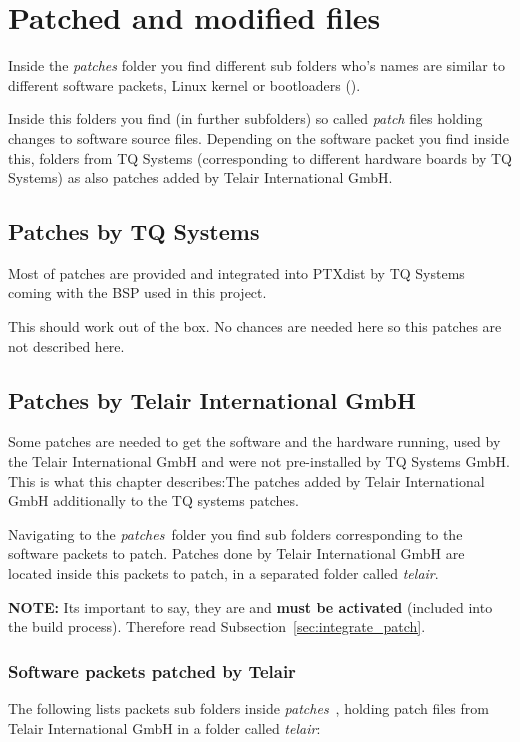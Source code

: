 \chapter{Patched and modified files}%
\label{cha:patches}
Inside the \textit{patches} folder you find different sub folders who's names
are similar to different software packets, Linux kernel or bootloaders
().

Inside this folders you find (in further subfolders\footnotemark[1]) so called
\textit{patch} files holding changes to software source files. Depending on the
software packet you find inside this, folders from TQ Systems (corresponding to
different hardware boards by TQ Systems) as also patches added by Telair
International GmbH.


\section{Patches by TQ Systems}%
\label{sec:patches}
Most of patches are provided and integrated into PTXdist by TQ Systems
coming with the BSP used in this project.~\cite{tq_bsp119}

This should work out of the box. No chances are needed here so this patches are
not described here.

\section{Patches by Telair International GmbH}%
\label{sec:Patch_by_telair} Some patches are needed to get the software and the
hardware running, used by the Telair International GmbH and were not
pre-installed by TQ Systems GmbH. This is what this chapter describes:\@ The
patches added by Telair International GmbH additionally to the TQ systems
patches.

Navigating to the \textit{patches}~\footnotemark[1] folder you find sub folders
corresponding to the software packets to patch. Patches done by Telair
International GmbH are located inside this packets to patch, in a separated
folder called \textit{telair}.

\textbf{NOTE:} Its important to say, they are and \textbf{must be activated}
(included into the build process). Therefore read
Subsection~\ref{sec:integrate_patch}.

\subsection{Software packets patched by Telair}
The following lists packets sub folders inside
\textit{patches}~\footnotemark[1],
holding patch files from Telair International GmbH in a folder called
\textit{telair}:

